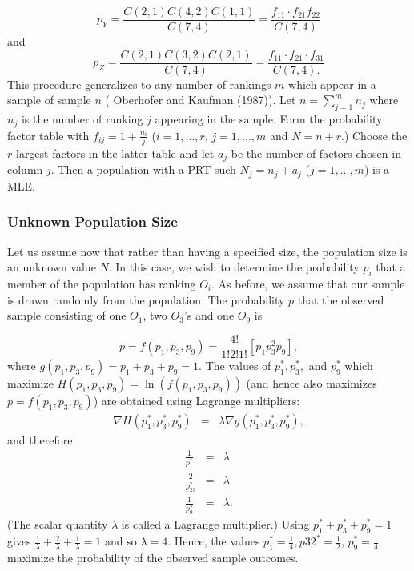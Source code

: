 \documentclass[a4paper, 12pt]{article}
\begin{document}
\begin{equation}
p_Y=\frac{C(2,1)C(4,2)C(1,1)}{C(7,4)}=\frac{f_{11} \cdot f_{21}f_{22}}{C(7,4)}
\end{equation}
{\flushleft and }
\begin{equation}
p_Z=\frac{C(2,1)C(3,2)C(2,1)}{C(7,4)}=\frac{f_{11}\cdot f_{21}\cdot f_{31}}{C(7,4).}
\end{equation}
{\flushleft This} procedure generalizes to any number of rankings $m$ which appear in a sample of sample $n$ ( Oberhofer and Kaufman (1987)). Let $n=\sum_{j=1}^m n_j$ where $n_j$ is the number of ranking $j$ appearing in the sample.  Form the probability factor table with $f_{ij}=1+\frac{n_i}{j}$ ($i=1,...,r$, $j=1,...,m$ and $N=n+r$.)  Choose the $r$ largest factors in the latter table and let $a_j$ be the number of factors chosen in column $j$.  Then a population with a PRT such  $N_j=n_j+a_j$ ($j=1,...,m$) is a MLE. 
\subsubsection{Unknown Population Size}


Let us assume now that rather than having a specified size, the population size is an unknown value $N$.  In this case, we wish to determine the probability $p_i$  that a member of the population has ranking $O_i$.  As before, we assume that our sample is drawn randomly from the population. The probability $p$ that the observed sample consisting of one $O_1$, two $O_3$'s and one $O_9$ is

\begin{equation}
p=f(p_1,p_3,p_9)=\frac{4!}{1!2!1!}[p_1p_3^2p_9],
\end{equation}
\label{eq:1}
{\flushleft where} $g(p_1,p_3,p_9)=p_1+p_3+p_9=1$.
The values of $p_1^*,p_3^*,$ and $p_9^*$ which maximize $H(p_1,p_3,p_9)=\ln (f(p_1,p_3,p_9))$ (and hence also maximizes $p=f(p_1,p_3,p_9)$)  are obtained using Lagrange multipliers:
\begin{eqnarray*}
	\nabla H(p_1^*,p_3^*,p_9^*) & = & \lambda \nabla g
	(p_1^*,p_3^*,p_9^*),
\end{eqnarray*}
{\flushleft and therefore}
\begin{eqnarray*}
	\frac{1}{p_1^*} & = & \lambda\\
	\frac{2}{p_23^*} & = & \lambda\\
	\frac{1}{p_9^*} & = & \lambda.
\end{eqnarray*}
{\flushleft (The scalar quantity $\lambda$ is called a Lagrange multiplier.) Using} $p_1^*+p_3^*+p_9^*=1$ gives $\frac{1}{\lambda} + \frac{2}{\lambda}+\frac{1}{\lambda}=1$ and so $ \lambda = 4$.  Hence, the values $p_1^*=\frac{1}{4}, p32^*=\frac{1}{2}$, $p_9^*=\frac{1}{4}$ maximize the probability of the observed sample outcomes.  
\end{document}
